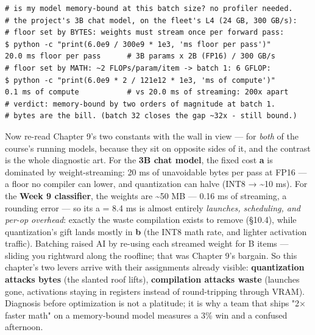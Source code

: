 \begin{terminalbox}
\begin{Verbatim}[breaklines=true,breakanywhere=true,fontsize=\small,formatcom=\color{tbbtermfg},codes=\tbbcodeactive]
# is my model memory-bound at this batch size? no profiler needed.
# the project's 3B chat model, on the fleet's L4 (24 GB, 300 GB/s):
# floor set by BYTES: weights must stream once per forward pass:
$ python -c "print(6.0e9 / 300e9 * 1e3, 'ms floor per pass')"
20.0 ms floor per pass      # 3B params x 2B (FP16) / 300 GB/s
# floor set by MATH: ~2 FLOPs/param/item -> batch 1: 6 GFLOP:
$ python -c "print(6.0e9 * 2 / 121e12 * 1e3, 'ms of compute')"
0.1 ms of compute           # vs 20.0 ms of streaming: 200x apart
# verdict: memory-bound by two orders of magnitude at batch 1.
# bytes are the bill. (batch 32 closes the gap ~32x - still bound.)
\end{Verbatim}
\end{terminalbox}

Now re-read Chapter 9's two constants with the wall in view — for \textit{both} of the course's running models, because they sit on opposite sides of it, and the contrast is the whole diagnostic art. For the \textbf{3B chat model}, the fixed cost \textbf{a} is dominated by weight-streaming: 20 ms of unavoidable bytes per pass at FP16 — a floor no compiler can lower, and quantization can halve (INT8 → \textasciitilde{}10 ms). For the \textbf{Week 9 classifier}, the weights are \textasciitilde{}50 MB — 0.16 ms of streaming, a rounding error — so its a = 8.4 ms is almost entirely \textit{launches, scheduling, and per-op overhead}: exactly the waste compilation exists to remove (§10.4), while quantization's gift lands mostly in \textbf{b} (the INT8 math rate, and lighter activation traffic). Batching raised AI by re-using each streamed weight for B items — sliding you rightward along the roofline; that was Chapter 9's bargain. So this chapter's two levers arrive with their assignments already visible: \textbf{quantization attacks bytes} (the slanted roof lifts), \textbf{compilation attacks waste} (launches gone, activations staying in registers instead of round-tripping through VRAM). Diagnosis before optimization is not a platitude; it is why a team that ships "2× faster math" on a memory-bound model measures a 3\% win and a confused afternoon.

